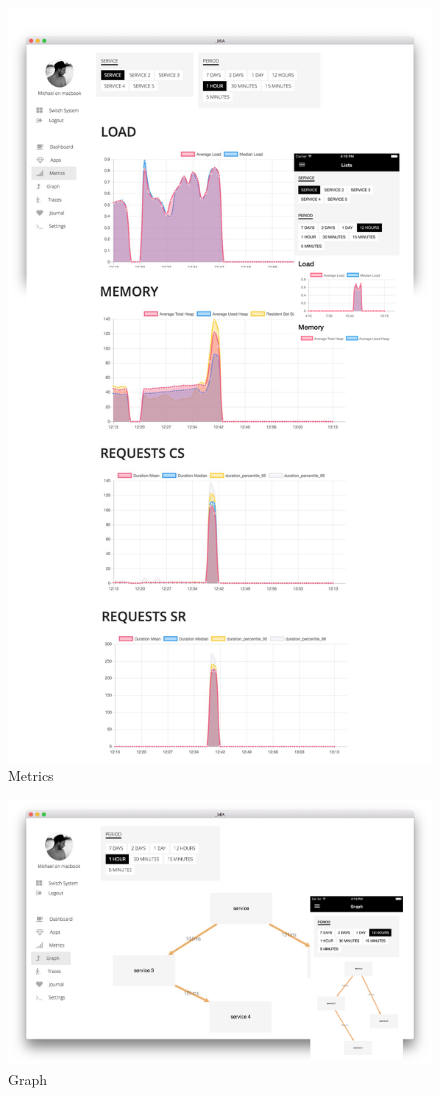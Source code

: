 \begin{figure}[h]
 \centering
 \includegraphics[width=0.9\linewidth]{appendix/app/metrics.png}
 \caption{Metrics}
\end{figure}


\begin{figure}[h]
 \centering
 \includegraphics[width=0.9\linewidth]{appendix/app/graph.png}
 \caption{Graph}
\end{figure}

